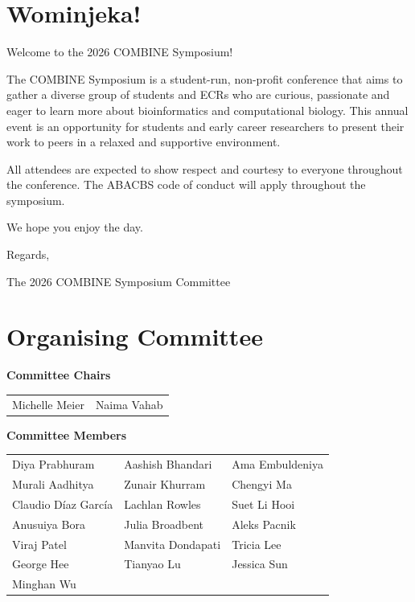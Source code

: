 \section{Wominjeka!}

Welcome to the 2026 COMBINE Symposium! 

The COMBINE Symposium is a student-run, non-profit conference that aims to gather a diverse group of students and ECRs who are curious, passionate and eager to learn more about bioinformatics and 
computational biology. This annual event is an opportunity for students and early career researchers to present their work to peers in a relaxed and supportive environment. 

All attendees are expected to show respect and courtesy to everyone throughout the conference. The ABACBS code of conduct will apply throughout the symposium. 

We hope you enjoy the day. 

Regards, 

The 2026 COMBINE Symposium Committee 

\section{Organising Committee}
\begin{center}
\textbf{Committee Chairs}\\
\begin{tabular}{ll}
Michelle Meier & Naima Vahab 
\end{tabular}
\end{center}

\begin{center}
\textbf{Committee Members}\\
\begin{tabular}{lll}
Diya Prabhuram &
Aashish Bhandari &
Ama Embuldeniya \\
Murali Aadhitya &
Zunair Khurram &
Chengyi Ma \\
Claudio Díaz García &
Lachlan Rowles &
Suet Li Hooi\\
Anusuiya Bora &
Julia Broadbent &
Aleks Pacnik \\
Viraj Patel &
Manvita Dondapati &
Tricia Lee \\
George Hee &
Tianyao Lu &
Jessica Sun \\
Minghan Wu 
\end{tabular}
\end{center}